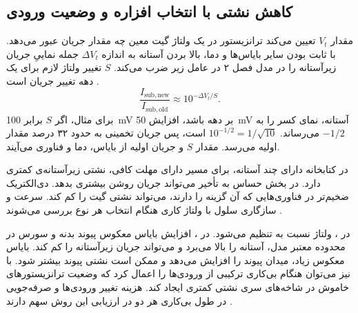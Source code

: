 \subsection{کاهش نشتی با انتخاب افزاره و وضعیت ورودی}
\label{sec:power-leakage-controls}

مقدار \(V_t\) تعیین می‌کند ترانزیستور در یک ولتاژ گیت معین چه
مقدار جریان عبور می‌دهد. با ثابت بودن سایر بایاس‌ها و دما، بالا بردن
آستانه به اندازه \(\Delta V_t\) جمله نماییِ جریان زیرآستانه را
در مدل فصل ۲ در عامل زیر ضرب می‌کند. \(S\) تغییر ولتاژ لازم برای
یک دهه تغییر جریان است
\cite[بخش‌های  و ]{weste}.
\[
  \frac{I_{\mathrm{sub,new}}}{I_{\mathrm{sub,old}}}
  \approx 10^{-\Delta V_t/S}.
\]
برای مثال، اگر \(S\) برابر \qty{100}{\milli\volt} بر دهه باشد،
افزایش \qty{50}{\milli\volt} آستانه، نمای کسر را به \(-1/2\)
می‌رساند. \(10^{-1/2}=1/\sqrt{10}\) است، پس جریان تخمینی به حدود
۳۲ درصد مقدار اولیه می‌رسد. مقدار \(S\) و جریان اولیه از بایاس، دما
و فناوری می‌آیند.

در کتابخانه دارای چند آستانه،  برای مسیر دارای
مهلت کافی، نشتی زیرآستانه‌ی کمتری دارد.  در بخش
حساس به تأخیر می‌تواند جریان روشن بیشتری بدهد. دی‌الکتریک ضخیم‌تر
در فناوری‌هایی که آن گزینه را دارند، می‌تواند نشتی گیت را کم کند.
سرعت و سازگاری سلول با ولتاژ کاری هنگام انتخاب هر نوع بررسی می‌شوند
\cite[بخش ، صفحه ۱۹۹]{weste}.

در ، ولتاژ  نسبت به  تنظیم
می‌شود. در ، افزایش بایاس معکوس پیوند بدنه و سورس در
محدوده معتبر مدل، آستانه را بالا می‌برد و می‌تواند جریان زیرآستانه
را کم کند. بایاس معکوس زیاد، میدان پیوند را افزایش می‌دهد و ممکن
است نشتی پیوند بیشتر شود. با  نیز می‌توان
هنگام بی‌کاری ترکیبی از ورودی‌ها را اعمال کرد که وضعیت ترانزیستورهای
خاموش در شاخه‌های سری نشتی کمتری ایجاد کند. هزینه تغییر ورودی‌ها
و صرفه‌جویی در طول بی‌کاری هر دو در ارزیابی این روش سهم دارند
\cite[بخش‌های  و ،
صفحات ۱۹۹ و ۲۰۰]{weste}.
